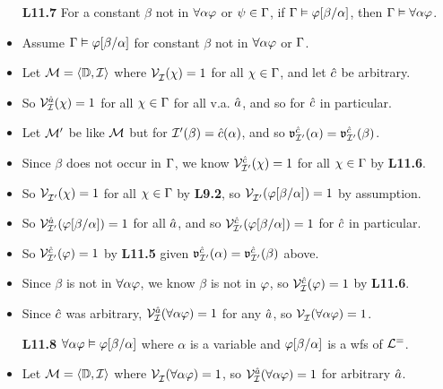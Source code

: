 \documentclass[a4paper, 11pt]{article} %
\begin{document}
\begin{itemize}
  \item[\bf L11.7] For a constant $\beta$ not in $\forall \alpha\varphi$ or $\psi\in\Gamma$, if $\Gamma \vDash \varphi[\beta/\alpha]$, then $\Gamma \vDash \forall \alpha\varphi$.
      \item Assume $\Gamma \vDash \varphi[\beta/\alpha]$ for constant $\beta$ not in $\forall \alpha\varphi$ or $\Gamma$.
      \item Let $\mathcal{M} = \langle\mathbb{D}, \mathcal{I}\rangle$ where $\mathcal{V}_{\mathcal{I}}^{}(\chi) = 1$ for all $\chi\in\Gamma$, and let $\hat{c}$ be arbitrary.
      \item So $\mathcal{V}_{\mathcal{I}}^{\hat{a}}(\chi) = 1$ for all $\chi\in\Gamma$ for all v.a. $\hat{a}$, and so for $\hat{c}$ in particular.
      \item Let $\mathcal{M}'$ be like $\mathcal{M}$ but for $\mathcal{I}'(\beta)=\hat{c}(\alpha)$, and so $\mathfrak{v}_{\mathcal{I}'}^{\hat{c}}(\alpha)=\mathfrak{v}_{\mathcal{I}'}^{\hat{c}}(\beta)$.
      \item Since $\beta$ does not occur in $\Gamma$, we know $\mathcal{V}_{\mathcal{I}'}^{\hat{c}}(\chi) = 1$ for all $\chi \in \Gamma$ by \textbf{L11.6}.
      \item So $\mathcal{V}_{\mathcal{I}'}^{}(\chi) = 1$ for all $\chi\in\Gamma$ by \textbf{L9.2}, so $\mathcal{V}_{\mathcal{I}'}^{}(\varphi[\beta/\alpha]) = 1$ by assumption.
      \item So $\mathcal{V}_{\mathcal{I}'}^{\hat{a}}(\varphi[\beta/\alpha])=1$ for all $\hat{a}$, and so $\mathcal{V}_{\mathcal{I}'}^{\hat{c}}(\varphi[\beta/\alpha])=1$ for $\hat{c}$ in particular.
      \item So $\mathcal{V}_{\mathcal{I}'}^{\hat{c}}(\varphi) = 1$ by \textbf{L11.5} given $\mathfrak{v}_{\mathcal{I}'}^{\hat{c}}(\alpha) = \mathfrak{v}_{\mathcal{I}'}^{\hat{c}}(\beta)$ above. 
      \item Since $\beta$ is not in $\forall \alpha\varphi$, we know $\beta$ is not in $\varphi$, so $\mathcal{V}_{\mathcal{I}}^{\hat{c}}(\varphi)=1$ by \textbf{L11.6}.
      \item Since $\hat{c}$ was arbitrary, $\mathcal{V}_{\mathcal{I}}^{\hat{a}}(\forall \alpha\varphi)=1$ for any $\hat{a}$, so $\mathcal{V}_{\mathcal{I}}^{}(\forall \alpha\varphi)=1$.
  \item[\bf L11.8] $\forall\alpha\varphi \vDash \varphi[\beta/\alpha]$ where $\alpha$ is a variable and $\varphi[\beta/\alpha]$ is a wfs of $\mathcal{L}^=$.
    \item Let $\mathcal{M} = \langle\mathbb{D}, \mathcal{I}\rangle$ where $\mathcal{V}_{\mathcal{I}}^{}(\forall \alpha\varphi) = 1$, so $\mathcal{V}_{\mathcal{I}}^{\hat{a}}(\forall \alpha\varphi)=1$ for arbitrary $\hat{a}$. 

\end{itemize}
\end{document}
